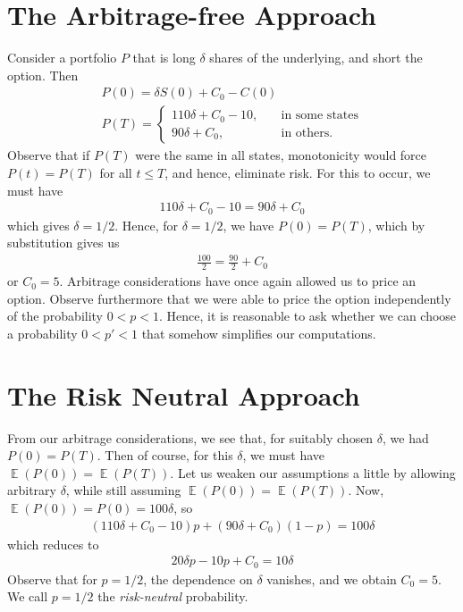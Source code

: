 \documentclass[12pt]{amsbook}
\DeclareMathOperator{\ex}{\mathbb{E}}
\theoremstyle{plain}
\theoremstyle{definition}
\theoremstyle{remark}
\numberwithin{equation}{section}  %
\begin{document}
\section{The Arbitrage-free Approach}
Consider a portfolio $P$
that is long $\delta$ shares of the underlying, and short the option.
Then
\begin{gather*}
	P(0)  = \delta S(0) + C_{0} - C(0)
	\\
	P(T)  = \begin{cases}
		110 \delta + C_{0} - 10, \quad & \text{in some states}
		\\
		90 \delta + C_{0}, \quad & \text{in others}.
	\end{cases}
\end{gather*}
Observe that if $P(T)$ were the same in all states, monotonicity would force
$P(t) = P(T)$ for all $t \le T$, and hence, eliminate risk. For this to occur,
we must have
\begin{equation*}
	\begin{split}
		110 \delta + C_{0} - 10 = 90 \delta + C_{0}
	\end{split}
\end{equation*}
which gives $\delta = 1/2$. Hence, for $\delta = 1/2$, we have
$P(0) = P(T)$, which by substitution gives us
\begin{equation*}
	\begin{split}
		\frac{100}{2} = \frac{90}{2} + C_{0}
	\end{split}
\end{equation*}
or $C_{0} = 5$. Arbitrage considerations have once again
allowed us to price an option. Observe furthermore that we were able
to price the option independently of the probability $0 < p < 1$. 
Hence, it is reasonable to ask whether we can choose a probability
$0 < p' < 1$ that somehow simplifies our computations.
\section{The Risk Neutral Approach}
From our arbitrage considerations, we see that, for suitably chosen
$\delta$, we had $P(0) = P(T)$. Then of course, for this $\delta$, we must
have $\ex(P(0)) = \ex(P(T))$. Let us weaken our assumptions a little by allowing
arbitrary $\delta$, while still assuming $\ex(P(0)) = \ex(P(T))$. 
Now, $\ex(P(0)) = P(0) = 100 \delta$, so
\begin{equation*}
	\begin{split}
		(110 \delta + C_{0} - 10) p + (90 \delta + C_{0}) (1- p) = 100 \delta
	\end{split}
\end{equation*}
which reduces to
\begin{equation*}
	\begin{split}
		20 \delta p - 10p + C_{0} = 10 \delta
	\end{split}
\end{equation*}
Observe that for $p = 1/2$, the dependence on $\delta$ vanishes, and we obtain
$C_{0} = 5$. We call $p = 1/2$ the \emph{risk-neutral} probability.
\end{document}
